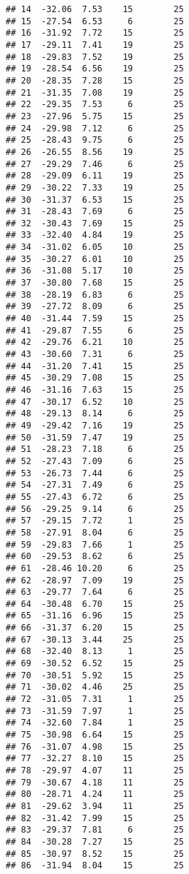 \documentclass[
]{article}
\begin{document}
\begin{verbatim}
## 14  -32.06  7.53    15        25
## 15  -27.54  6.53     6        25
## 16  -31.92  7.72    15        25
## 17  -29.11  7.41    19        25
## 18  -29.83  7.52    19        25
## 19  -28.54  6.56    19        25
## 20  -28.35  7.28    15        25
## 21  -31.35  7.08    19        25
## 22  -29.35  7.53     6        25
## 23  -27.96  5.75    15        25
## 24  -29.98  7.12     6        25
## 25  -28.43  9.75     6        25
## 26  -26.55  8.56    19        25
## 27  -29.29  7.46     6        25
## 28  -29.09  6.11    19        25
## 29  -30.22  7.33    19        25
## 30  -31.37  6.53    15        25
## 31  -28.43  7.69     6        25
## 32  -30.43  7.69    15        25
## 33  -32.40  4.84    19        25
## 34  -31.02  6.05    10        25
## 35  -30.27  6.01    10        25
## 36  -31.08  5.17    10        25
## 37  -30.80  7.68    15        25
## 38  -28.19  6.83     6        25
## 39  -27.72  8.09     6        25
## 40  -31.44  7.59    15        25
## 41  -29.87  7.55     6        25
## 42  -29.76  6.21    10        25
## 43  -30.60  7.31     6        25
## 44  -31.20  7.41    15        25
## 45  -30.29  7.08    15        25
## 46  -31.16  7.63    15        25
## 47  -30.17  6.52    10        25
## 48  -29.13  8.14     6        25
## 49  -29.42  7.16    19        25
## 50  -31.59  7.47    19        25
## 51  -28.23  7.18     6        25
## 52  -27.43  7.09     6        25
## 53  -26.73  7.44     6        25
## 54  -27.31  7.49     6        25
## 55  -27.43  6.72     6        25
## 56  -29.25  9.14     6        25
## 57  -29.15  7.72     1        25
## 58  -27.91  8.04     6        25
## 59  -29.83  7.66     1        25
## 60  -29.53  8.62     6        25
## 61  -28.46 10.20     6        25
## 62  -28.97  7.09    19        25
## 63  -29.77  7.64     6        25
## 64  -30.48  6.70    15        25
## 65  -31.16  6.96    15        25
## 66  -31.37  6.20    15        25
## 67  -30.13  3.44    25        25
## 68  -32.40  8.13     1        25
## 69  -30.52  6.52    15        25
## 70  -30.51  5.92    15        25
## 71  -30.02  4.46    25        25
## 72  -31.05  7.31     1        25
## 73  -31.59  7.97     1        25
## 74  -32.60  7.84     1        25
## 75  -30.98  6.64    15        25
## 76  -31.07  4.98    15        25
## 77  -32.27  8.10    15        25
## 78  -29.97  4.07    11        25
## 79  -30.67  4.18    11        25
## 80  -28.71  4.24    11        25
## 81  -29.62  3.94    11        25
## 82  -31.42  7.99    15        25
## 83  -29.37  7.81     6        25
## 84  -30.28  7.27    15        25
## 85  -30.97  8.52    15        25
## 86  -31.94  8.04    15        25

\end{verbatim}
\end{document}
